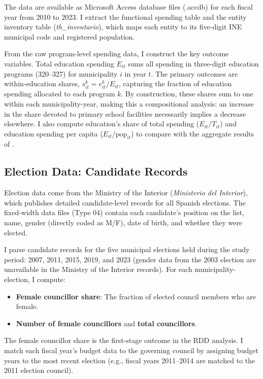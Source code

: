 \documentclass[12pt]{article}
\begin{document}
The data are available as Microsoft Access database files (.accdb) for each fiscal year from 2010 to 2023. I extract the functional spending table and the entity inventory table (\emph{tb\_inventario}), which maps each entity to its five-digit INE municipal code and registered population.

From the raw program-level spending data, I construct the key outcome variables. Total education spending $E_{it}$ sums all spending in three-digit education programs (320--327) for municipality $i$ in year $t$. The primary outcomes are within-education shares, $s_{it}^k = e_{it}^k / E_{it}$, capturing the fraction of education spending allocated to each program $k$. By construction, these shares sum to one within each municipality-year, making this a compositional analysis: an increase in the share devoted to primary school facilities necessarily implies a decrease elsewhere. I also compute education's share of total spending ($E_{it} / T_{it}$) and education spending per capita ($E_{it} / \text{pop}_{it}$) to compare with the aggregate results of \citet{bagues2021can}.

\subsection{Election Data: Candidate Records}

Election data come from the Ministry of the Interior (\emph{Ministerio del Interior}), which publishes detailed candidate-level records for all Spanish elections. The fixed-width data files (Type 04) contain each candidate's position on the list, name, gender (directly coded as M/F), date of birth, and whether they were elected.

I parse candidate records for the five municipal elections held during the study period: 2007, 2011, 2015, 2019, and 2023 (gender data from the 2003 election are unavailable in the Ministry of the Interior records). For each municipality-election, I compute:

\begin{itemize}
    \item \textbf{Female councillor share}: The fraction of elected council members who are female.
    \item \textbf{Number of female councillors} and \textbf{total councillors}.
\end{itemize}

The female councillor share is the first-stage outcome in the RDD analysis. I match each fiscal year's budget data to the governing council by assigning budget years to the most recent election (e.g., fiscal years 2011--2014 are matched to the 2011 election council).
\end{document}
